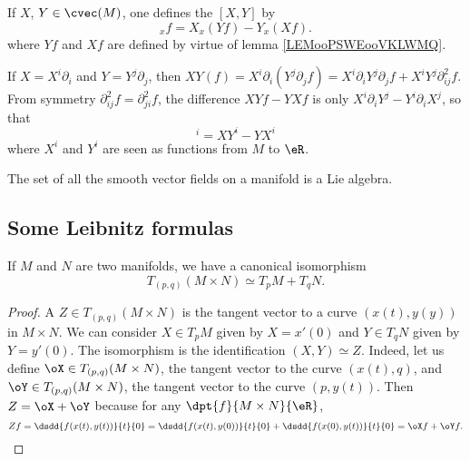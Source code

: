 \begin{propositionDef}      \label{DEFooHOTOooRaPwyo}
    If $X$, $Y\in\cvec(M)$, one defines the  $[X,Y]$ by
    \begin{equation}
      [X,Y]_xf=X_x(Yf)-Y_x(Xf).
    \end{equation}
    where \( Yf\) and \( Xf\) are defined by virtue of lemma \ref{LEMooPSWEooVKLWMQ}.
\end{propositionDef}

If $X=X^i\partial_i$ and $Y=Y^j\partial_j$, then
$XY(f)=X^i\partial_i(Y^j\partial_jf)
     =X^i\partial_i Y^j\partial_j f+X^iY^j\partial^2_{ij}f$.
From symmetry $\partial^2_{ij}f=\partial^2_{ji}f$, the difference $XYf-YXf$ is only $X^i\partial_iY^j-Y^i\partial_iX^j$, so that
\begin{equation}
  [X,Y]^i=XY^i-YX^i
\end{equation}
where $X^i$ and $Y^i$ are seen as functions from $M$ to $\eR$.

\begin{proposition}       \label{PROPooSWQSooSEfTuX}
    The set of all the smooth vector fields on a manifold is a Lie algebra.
\end{proposition}

\subsection{Some Leibnitz formulas}

\begin{lemma}
If $M$ and $N$ are two manifolds, we have a canonical isomorphism
\[
     T_{(p,q)}(M\times N)\simeq T_pM+T_qN.
\]
\label{lemLeibnitz}
\end{lemma}

\begin{proof}
A $Z\in T_{(p,q)}(M\times N)$ is the tangent vector to a curve $(x(t),y(y))$ in $M\times N$. We can consider $X\in T_pM$ given by $X=x'(0)$ and $Y\in T_qN$ given by $Y=y'(0)$. The isomorphism is the identification $(X,Y)\simeq Z$. Indeed, let us define $\oX\in T_{(p,q)}(M\times N)$, the tangent vector to the curve $(x(t),q)$, and $\oY\in T_{(p,q)}(M\times N)$, the tangent vector to the curve $(p,y(t))$. Then $Z=\oX+\oY$ because for any $\dpt{f}{M\times N}{\eR}$,
\begin{equation}
 Zf=\dsdd{f(x(t),y(t))}{t}{0}
   =\dsdd{f(x(t),y(0))}{t}{0}+\dsdd{f(x(0),y(t))}{t}{0}
   =\oX f+\oY f.
\end{equation}
\end{proof}

